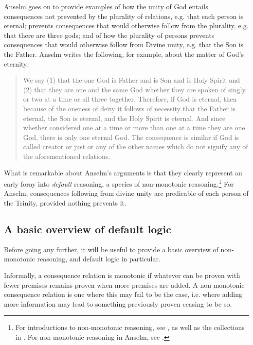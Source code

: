 \documentclass[]{article}
\begin{document}
Anselm goes on to provide examples of how the unity of God entails consequences not prevented by the plurality of relations, e.g. that each person is eternal; prevents consequences that would otherwise follow from the plurality, e.g. that there are three gods; and of how the plurality of persons prevents consequences that would otherwise follow from Divine unity, e.g. that the Son is the Father. Anselm writes the following, for example, about the matter of God's eternity:

\begin{quote}
	We say (1) that the one God is Father and is Son and is Holy Spirit and (2) that they are one and the same God whether they are spoken of singly or two at a time or all three together. Therefore, if God is eternal, then because of the oneness of deity it follows of necessity that the Father is eternal, the Son is eternal, and the Holy Spirit is eternal. And since whether considered one at a time or more than one at a time they are one God, there is only one eternal God. The consequence is similar if God is called creator or just or any of the other names which do not signify any of the aforementioned relations.\autocite[470]{AnselmDeProc}
\end{quote}

What is remarkable about Anselm's arguments is that they clearly represent an early foray into \textit{default} reasoning, a species of non-monotonic reasoning.\footnote{For introductions to non-monotonic reasoning, see  \autocite{Reiter1980,Horty2001,Makinson2005,Strasser2014}, as well as the collections in \autocite{Ginsberg1987,SchurzLeitgeb2005}. For non-monotonic reasoning in Anselm, see \cite{Archambault2017e}.}  For Anselm, consequences following from divine unity are predicable of each person of the Trinity, provided nothing prevents it.

\subsection{A basic overview of default logic}
Before going any further, it will be useful to provide a basic overview of non-monotonic reasoning, and default logic in particular.

Informally, a consequence relation is monotonic if whatever can be proven with fewer premises remains proven when more premises are added. A non-monotonic consequence relation is one where this may fail to be the case, i.e. where adding more information may lead to something previously proven ceasing to be so. 
\end{document}
